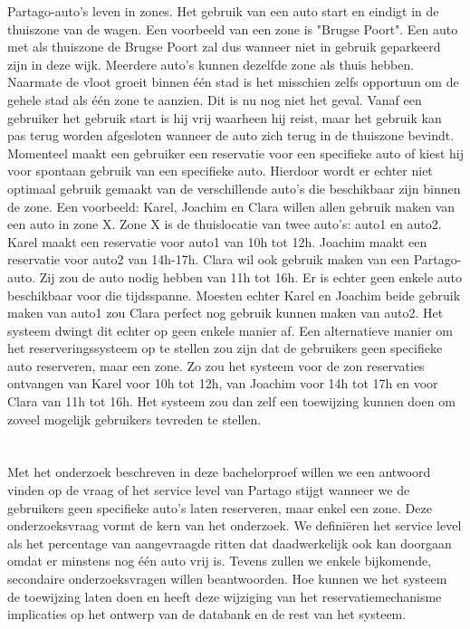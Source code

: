 Partago-auto's leven in zones. Het gebruik van een auto start en eindigt in de thuiszone van de wagen. Een voorbeeld van een zone is "Brugse Poort". Een auto met als thuiszone de Brugse Poort zal dus wanneer niet in gebruik geparkeerd zijn in deze wijk. Meerdere auto's kunnen dezelfde zone als thuis hebben. Naarmate de vloot groeit binnen één stad is het misschien zelfs opportuun om de gehele stad als één zone te aanzien. Dit is nu nog niet het geval. Vanaf een gebruiker het gebruik start is hij vrij waarheen hij reist, maar het gebruik kan pas terug worden afgesloten wanneer de auto zich terug in de thuiszone bevindt. Momenteel maakt een gebruiker een reservatie voor een specifieke auto of kiest hij voor spontaan gebruik van een specifieke auto. Hierdoor wordt er echter niet optimaal gebruik gemaakt van de verschillende auto's die beschikbaar zijn binnen de zone. Een voorbeeld: Karel, Joachim en Clara willen allen gebruik maken van een auto in zone X. Zone X is de thuislocatie van twee auto's: auto1 en auto2. Karel maakt een reservatie voor auto1 van 10h tot 12h. Joachim maakt een reservatie voor auto2 van 14h-17h. Clara wil ook gebruik maken van een Partago-auto. Zij zou de auto nodig hebben van 11h tot 16h. Er is echter geen enkele auto beschikbaar voor die tijdsspanne. Moesten echter Karel en Joachim beide gebruik maken van auto1 zou Clara perfect nog gebruik kunnen maken van auto2. Het systeem dwingt dit echter op geen enkele manier af. Een alternatieve manier om het reserveringssysteem op te stellen zou zijn dat de gebruikers geen specifieke auto reserveren, maar een zone. Zo zou het systeem voor de zon reservaties ontvangen van Karel voor 10h tot 12h, van Joachim voor 14h tot 17h en voor Clara van 11h tot 16h. Het systeem zou dan zelf een toewijzing kunnen doen om zoveel mogelijk gebruikers tevreden te stellen.

\section{}
\label{sec:onderzoeksvraag}

Met het onderzoek beschreven in deze bachelorproef willen we een antwoord vinden op de vraag of het service level van Partago stijgt wanneer we de gebruikers geen specifieke auto's laten reserveren, maar enkel een zone. Deze onderzoeksvraag vormt de kern van het onderzoek. We definiëren het service level als het percentage van aangevraagde ritten dat daadwerkelijk ook kan doorgaan omdat er minstens nog één auto vrij is. Tevens zullen we enkele bijkomende, secondaire onderzoeksvragen willen beantwoorden. Hoe kunnen we het systeem de toewijzing laten doen en heeft deze wijziging van het reservatiemechanisme implicaties op het ontwerp van de databank en de rest van het systeem.

